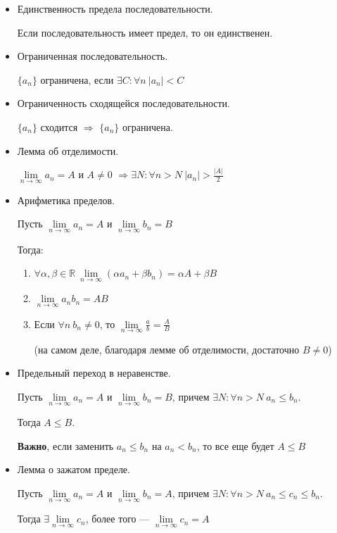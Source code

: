\documentclass[14pt]{extarticle}
\numberwithin{equation}{section}
\newcommand{\RR}{\mathbb{R}}
\begin{document}
    \begin{itemize}
        \item
            Единственность предела последовательности.

            Если последовательность имеет предел, то он единственен.
        \item
            Ограниченная последовательность.

            \( \{ a_n \} \) ограничена, если \( \exists C : \forall n \ |a_n| < C \)
        \item
            Ограниченность сходящейся последовательности.

            \( \{ a_n \} \) сходится \( \Rightarrow \) \( \{ a_n \} \) ограничена.
        \item
            Лемма об отделимости.

            \( \lim\limits_{n \to \infty} a_n = A \) и \( A \neq 0 \)
            \( \Rightarrow \exists N : \forall n > N \ |a_n| > \frac{|A|}{2} \)
        \item
            Арифметика пределов.

            Пусть \( \lim\limits_{n \to \infty} a_n = A \) и \( \lim\limits_{n \to \infty} b_n = B \)

            Тогда:
            \begin{enumerate}
                \item
                    \( \forall \alpha, \beta \in \RR \ \lim\limits_{n \to \infty} (\alpha a_n + \beta b_n) = \alpha A + \beta B \)
                \item
                    \( \lim\limits_{n \to \infty} a_n b_n = AB \)
                \item
                    Если \( \forall n \ b_n \neq 0 \),
                    то \( \lim\limits_{n \to \infty} \frac{a}{b} = \frac{A}{B} \)

                    (на самом деле, благодаря лемме об отделимости, достаточно \( B \neq 0 \))
            \end{enumerate}
        \item
            Предельный переход в неравенстве.

            Пусть \( \lim\limits_{n \to \infty} a_n = A \) и \( \lim\limits_{n \to \infty} b_n = B \),
            причем \( \exists N : \forall n > N \ a_n \leq b_n \).

            Тогда \( A \leq B \).

            \textbf{Важно}, если заменить \( a_n \leq b_n \) на \( a_n < b_n \), то все еще будет \( A \leq B \)
        \item
            Лемма о зажатом пределе.

            Пусть \( \lim\limits_{n \to \infty} a_n = A \) и \( \lim\limits_{n \to \infty} b_n = A \),
            причем \( \exists N : \forall n > N \ a_n \leq c_n \leq b_n \).

            Тогда \( \exists \lim\limits_{n \to \infty} c_n \),
            более того --- \( \lim\limits_{n \to \infty} c_n = A \)
    \end{itemize}
\end{document}
